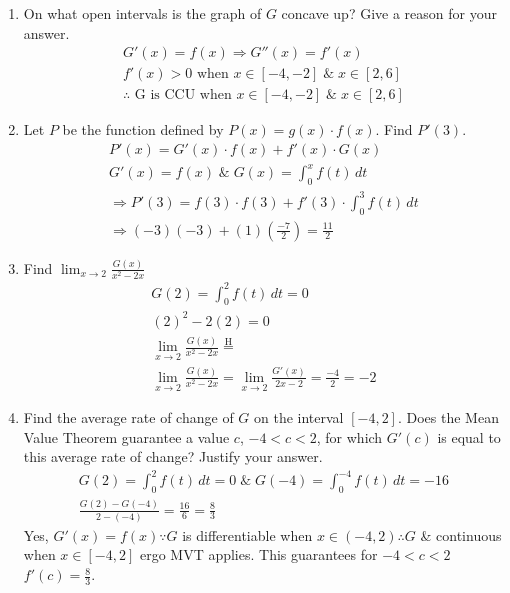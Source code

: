 \documentclass[11pt,letterpaper]{article}
\begin{document}
\begin{enumerate}
    \item On what open intervals is the graph of $G$ concave up? Give a reason for your answer.
    \begin{align*}
        G'(x)=f(x) \Longrightarrow G''(x)=f'(x)\\
       f'(x) >0 \text{ when } x\in[-4,-2] \; \& \; x\in[2,6] \\
      \therefore \text{ G is CCU} \text{ when } x\in[-4,-2] \; \& \; x\in[2,6]
    \end{align*}
    \item Let $P$ be the function defined by $P(x)=g(x)\cdot f(x)$. Find $P'(3)$.
    \begin{align*}
        P'(x)=G'(x)\cdot f(x)+ f'(x)\cdot G(x)\\
        G'(x)=f(x) \; \& \; G(x)=\int_{0}^{x} f(t) \, dt\\
        \Rightarrow P'(3)=f(3)\cdot f(3)+ f'(3)\cdot \int_{0}^{3} f(t) \, dt\\
        \Rightarrow (-3)(-3)+(1)(\frac{-7}{2})=\frac{11}{2}
    \end{align*}
    \item Find $\lim_{x\to2} \frac{G(x)}{x^2-2x}$
    \begin{align*}
        G(2)=\int_{0}^{2} f(t) \, dt =0 \\
        (2)^2-2(2)=0 \\
        \lim_{x\to2} \frac{G(x)}{x^2-2x} \overset{\mathrm{H}}{=}\\
          \lim_{x\to2} \frac{G(x)}{x^2-2x} =   \lim_{x\to2} \frac{G'(x)}{2x-2} = \frac{-4}{2}=-2
    \end{align*}
    \item Find the average rate of change of $G$ on the interval $[−4, 2]$. Does the Mean Value Theorem guarantee a value $c$, $−4 < c < 2$, for which $G'(c)$ is equal to this average rate of change? Justify your answer.
    \begin{align*}
G(2)=\int_{0}^{2} f(t) \, dt =0 \; \& \; G(-4)=\int_{0}^{-4} f(t) \, dt =-16 \\
\frac{G(2)-G(-4)}{2-(-4)} =\frac{16}{6}= \frac{8}{3}
    \end{align*}
Yes, $G'(x)=f(x) \because G$ is differentiable when $x\in(-4,2) \therefore G$ & continuous when $x\in[-4,2]$ ergo MVT applies. This guarantees for $-4 < c < 2$ $f'(c)=\frac{8}{3}$.
\end{enumerate}
\end{document}
